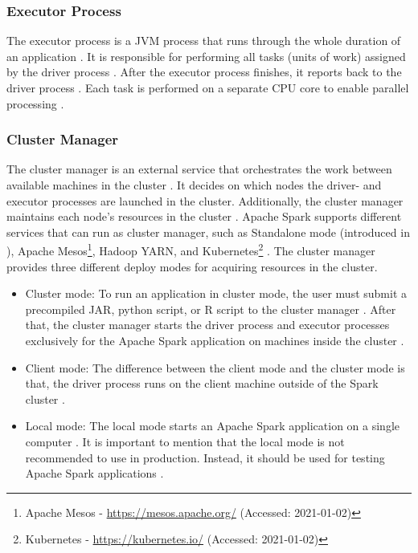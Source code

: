 \subsubsection{Executor Process}
The executor process is a JVM process that runs through the whole duration of an application \cite{Hien2018Spark, Apache2020Spark}.
It is responsible for performing all tasks (units of work) assigned by the driver process \cite{Chambers2018Spark}.
After the executor process finishes, it reports back to the driver process \cite{Chambers2018Spark}.
Each task is performed on a separate CPU core to enable parallel processing \cite{Hien2018Spark}.


\subsubsection{Cluster Manager}
\label{subsubsec:04_spark_architecture_manager}
The cluster manager is an external service that orchestrates the work between available machines in the cluster \cite{Hien2018Spark, Apache2020Spark}.
It decides on which nodes the driver- and executor processes are launched in the cluster.
Additionally, the cluster manager maintains each node's resources in the cluster \cite{Hien2018Spark, Chambers2018Spark}.
Apache Spark supports different services that can run as cluster manager, such as Standalone mode (introduced in ), Apache Mesos\footnote{Apache Mesos - \url{https://mesos.apache.org/} (Accessed: 2021-01-02)}, Hadoop YARN\cite{Murthy2013Yarn}, and Kubernetes\footnote{Kubernetes - \url{https://kubernetes.io/} (Accessed: 2021-01-02)} \cite{Apache2020Spark}.
The cluster manager provides three different deploy modes for acquiring resources in the cluster.
\begin{itemize}
\item Cluster mode:
To run an application in cluster mode, the user must submit a precompiled JAR, python script, or R script to the cluster manager \cite{Chambers2018Spark}. After that, the cluster manager starts the driver process and executor processes exclusively for the Apache Spark application on machines inside the cluster \cite{Chambers2018Spark, Hien2018Spark}.

\item Client mode:
The difference between the client mode and the cluster mode is that, the driver process runs on the client machine outside of the Spark cluster \cite{Chambers2018Spark}.

\item Local mode:
The local mode starts an Apache Spark application on a single computer \cite{Chambers2018Spark}. It is important to mention that the local mode is not recommended to use in production. Instead, it should be used for testing Apache Spark applications \cite{Chambers2018Spark}.
\end{itemize}


